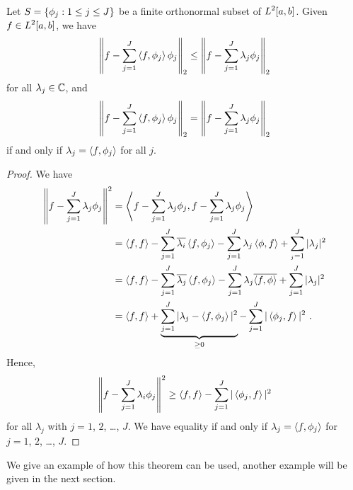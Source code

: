 \begin{theorem}
Let $\displaystyle S = \{\phi_j : 1 \leq j \leq J\}$ be a finite
orthonormal subset of $\displaystyle L^2[a,b]$.  Given
$\displaystyle f\in L^2[a,b]$, we have
\[
\left\| f - \sum_{j=1}^J \left\langle{f} , {\phi_j}\right\rangle \phi_j \right\|_2
\leq \left\| f - \sum_{j=1}^J \lambda_j \phi_j \right\|_2
\]
for all $\lambda_j \in \mathbb{C}$, and
\[
\left\| f - \sum_{j=1}^J \left\langle{f} , {\phi_j}\right\rangle \phi_j \right\|_2
= \left\| f - \sum_{j=1}^J \lambda_j \phi_j \right\|_2
\]
if and only if $\lambda_j = \left\langle{f} , {\phi_j}\right\rangle$ for all $j$.
\label{appr_finiteS}
\end{theorem}

\begin{proof}
We have
\begin{align*}
\left\| f - \sum_{j=1}^J \lambda_j \phi_j \right\|^2 &=
\left\langle{f - \sum_{j=1}^J \lambda_j\phi_j} , {f - \sum_{j=1}^J \lambda_j\phi_j}\right\rangle \\
& = \left\langle{f} , {f}\right\rangle - \sum_{j=1}^J \overline{\lambda_i}\left\langle{f} , {\phi_j}\right\rangle
- \sum_{j=1}^J \lambda_j\left\langle{\phi} , {f}\right\rangle + \sum_{_j=1}^J |\lambda_j|^2 \\
& = \left\langle{f} , {f}\right\rangle - \sum_{j=1}^J \overline{\lambda_j}\left\langle{f} , {\phi_j}\right\rangle
- \sum_{j=1}^J \lambda_j \overline{\left\langle{f} , {\phi}\right\rangle}
+ \sum_{j=1}^J |\lambda_j|^2 \\
&= \left\langle{f} , {f}\right\rangle
+ \underbrace{\sum_{j=1}^J |\lambda_j - \left\langle{f} , {\phi_j}\right\rangle|^2}_{\geq 0} -
\sum_{j=1}^J |\left\langle{\phi_j} , {f}\right\rangle|^2 \ .
\end{align*}
Hence,
\[
\left\| f - \sum_{j=1}^J \lambda_i \phi_j \right\|^2 \geq
\left\langle{f} , {f}\right\rangle- \sum_{j=1}^J |\left\langle{\phi_j} , {f}\right\rangle|^2
\]
for all $\lambda_j$ with $j=1$, $2$, \ldots, $J$.  We have equality if
and only if $\lambda_j = \left\langle{f} , {\phi_j}\right\rangle$ for $j=1$, $2$, \ldots, $J$.
\end{proof}

We give an example of how this theorem can be used, another example will be
given in the next section.

